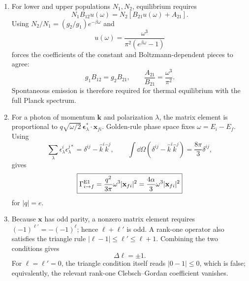 \begin{enumerate}
\begin{enumerate}
\item
For lower and upper populations \(N_1,N_2\), equilibrium requires
\[
 N_1B_{12}u(\omega)=N_2[B_{21}u(\omega)+A_{21}].
\]
Using \(N_2/N_1=(g_2/g_1)e^{-\beta\omega}\) and
\[
 u(\omega)=\frac{\omega^3}{\pi^2(e^{\beta\omega}-1)}
\]
forces the coefficients of the constant and Boltzmann-dependent pieces to
agree:
\[
 \boxed{g_1B_{12}=g_2B_{21},\qquad
 \frac{A_{21}}{B_{21}}=\frac{\omega^3}{\pi^2}.}
\]
Spontaneous emission is therefore required for thermal equilibrium with
the full Planck spectrum.
\item
For a photon of momentum \(\mathbf k\) and polarization \(\lambda\), the
matrix element is proportional to
\(q\sqrt{\omega/2}\,
\boldsymbol\epsilon_\lambda^*\cdot\mathbf x_{fi}\).
Golden-rule phase space fixes \(\omega=E_i-E_f\).  Using
\[
 \sum_\lambda\epsilon_\lambda^i\epsilon_\lambda^{j*}
 =\delta^{ij}-\widehat k^i\widehat k^j,\qquad
 \int \dd\Omega(\delta^{ij}-\widehat k^i\widehat k^j)
 =\frac{8\pi}{3}\delta^{ij},
\]
gives
\[
 \boxed{\Gamma_{i\to f}^{\rm E1}
 =\frac{q^2}{3\pi}\omega^3|\mathbf x_{fi}|^2
 =\frac{4\alpha}{3}\omega^3|\mathbf x_{fi}|^2}
\]
for \(|q|=e\).
\item
Because \(\mathbf x\) has odd parity, a nonzero matrix element requires
\((-1)^{\ell'}=-(-1)^\ell\); hence \(\ell+\ell'\) is odd.  A rank-one
operator also satisfies the triangle rule
\(|\ell-1|\leq\ell'\leq\ell+1\).  Combining the two conditions gives
\[
 \boxed{\Delta\ell=\pm1.}
\]
For \(\ell=\ell'=0\), the triangle condition itself reads
\(|0-1|\leq0\), which is false; equivalently, the relevant rank-one
Clebsch--Gordan coefficient vanishes.
\end{enumerate}


\end{enumerate}
